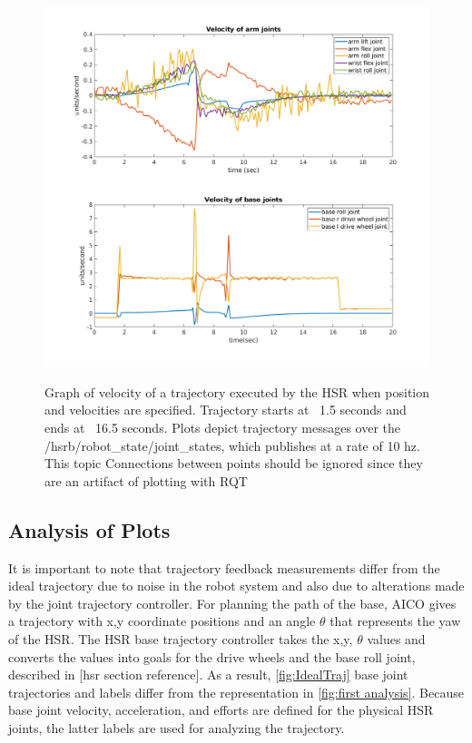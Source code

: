 \documentclass[12pt]{article}
\begin{document}
        \begin{figure}
            \centering
            \includegraphics[width=\linewidth]{2020.04.01/vel_joints.png}
            \label{fig:veljoints}
            \caption{Graph of velocity of a trajectory executed by the HSR when position and velocities are specified. Trajectory starts at ~1.5 seconds and ends at ~16.5 seconds. Plots depict trajectory messages over the /hsrb/robot\_state/joint\_states, which publishes at a rate of 10 hz. This topic Connections between points should be ignored since they are an artifact of plotting with RQT}
        \end{figure}
        


    \subsection{Analysis of Plots}
        It is important to note that trajectory feedback measurements differ from the ideal trajectory due to noise in the robot system and also due to alterations made by the joint trajectory controller. 
        For planning the path of the base, AICO gives a trajectory with x,y coordinate positions and an angle \(\theta\) that represents the yaw of the HSR. The HSR base trajectory controller takes the x,y, \(\theta\) values and converts the values into goals for the drive wheels and the base roll joint, described in [hsr section reference]. As a result, \cref{fig:IdealTraj} base joint trajectories and labels differ from the representation in \cref{fig:first analysis}. Because base joint velocity, acceleration, and efforts are defined for the physical HSR joints, the latter labels are used for analyzing the trajectory.
\end{document}
